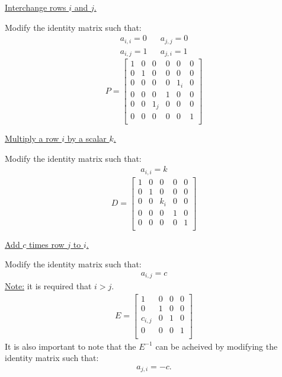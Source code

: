 \documentclass{article}
\newcommand{\centertext}[1]{\begin{center}#1\end{center}}
\begin{document}
    \begin{multicols}{3}
        \noindent
        \centertext{\underline{Interchange rows $i$ and $j$.}}
        Modify the identity matrix such that:
        \begin{align*}
            a_{i, i} = 0 && a_{j, j} = 0\\ a_{i, j} = 1 && a_{j, i} = 1
        \end{align*}
        \[
            P = \begin{bmatrix}
                1 & 0 & 0 & 0 & 0 & 0\\
                0 & 1 & 0 & 0 & 0 & 0\\
                0 & 0 & 0 & 0 & 1_i & 0\\
                0 & 0 & 0 & 1 & 0 & 0\\
                0 & 0 & 1_j & 0 & 0 & 0\\
                0 & 0 & 0 & 0 & 0 & 1\\
            \end{bmatrix}  
        \]        
        \vfill\null\columnbreak
        
        \centertext{\underline{Multiply a row $i$ by a scalar $k$.}}
        Modify the identity matrix such that:
        \begin{align*}
            a_{i, i} = k
        \end{align*}
        \[
            D = \begin{bmatrix}
                1 & 0 & 0 & 0 & 0\\
                0 & 1 & 0 & 0 & 0\\
                0 & 0 & k_i & 0 & 0\\
                0 & 0 & 0 & 1 & 0\\
                0 & 0 & 0 & 0 & 1\\
            \end{bmatrix}
        \]
        \vfill\null\columnbreak

        \centertext{\underline{Add $c$ times row $j$ to $i$.}}
        Modify the identity matrix such that:
        \begin{align*}
            a_{i,j} = c
        \end{align*}
        \underline{Note:} it is required that $i > j$.
        \begin{align*}
            E = \begin{bmatrix}
                1 & 0 & 0 & 0\\
                0 & 1 & 0 & 0\\
                c_{i,j} & 0 & 1 & 0\\
                0 & 0 & 0 & 1\\
            \end{bmatrix}
        \end{align*}
        It is also important to note that the $E^{-1}$ can be acheived by modifying
        the identity matrix such that:
        \begin{align*}
            a_{j, i} = -c.
        \end{align*}
    \end{multicols}
\end{document}
